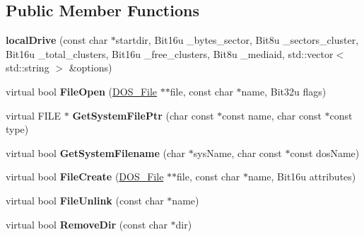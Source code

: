 \subsection*{Public Member Functions}
\begin{DoxyCompactItemize}
\item 
\hypertarget{classlocalDrive_aef6ba8f0095a362694e5b505836dd3a3}{{\bfseries local\-Drive} (const char $\ast$startdir, Bit16u \-\_\-bytes\-\_\-sector, Bit8u \-\_\-sectors\-\_\-cluster, Bit16u \-\_\-total\-\_\-clusters, Bit16u \-\_\-free\-\_\-clusters, Bit8u \-\_\-mediaid, std\-::vector$<$ std\-::string $>$ \&options)}\label{classlocalDrive_aef6ba8f0095a362694e5b505836dd3a3}

\item 
\hypertarget{classlocalDrive_ad995ca152b5317564349a83c1b71147c}{virtual bool {\bfseries File\-Open} (\hyperlink{classDOS__File}{D\-O\-S\-\_\-\-File} $\ast$$\ast$file, const char $\ast$name, Bit32u flags)}\label{classlocalDrive_ad995ca152b5317564349a83c1b71147c}

\item 
\hypertarget{classlocalDrive_acc272d364d252ecb9823d4391487aa9a}{virtual F\-I\-L\-E $\ast$ {\bfseries Get\-System\-File\-Ptr} (char const $\ast$const name, char const $\ast$const type)}\label{classlocalDrive_acc272d364d252ecb9823d4391487aa9a}

\item 
\hypertarget{classlocalDrive_adde1e1e3bfcb6fc872b95811afcbd912}{virtual bool {\bfseries Get\-System\-Filename} (char $\ast$sys\-Name, char const $\ast$const dos\-Name)}\label{classlocalDrive_adde1e1e3bfcb6fc872b95811afcbd912}

\item 
\hypertarget{classlocalDrive_aebbef4c6ec78533bb0a5d9fd3d516926}{virtual bool {\bfseries File\-Create} (\hyperlink{classDOS__File}{D\-O\-S\-\_\-\-File} $\ast$$\ast$file, const char $\ast$name, Bit16u attributes)}\label{classlocalDrive_aebbef4c6ec78533bb0a5d9fd3d516926}

\item 
\hypertarget{classlocalDrive_a52db5697876d2dead4bb414f773c78db}{virtual bool {\bfseries File\-Unlink} (const char $\ast$name)}\label{classlocalDrive_a52db5697876d2dead4bb414f773c78db}

\item 
\hypertarget{classlocalDrive_a5cd7f73b33837c8578c0446b9f3af3ba}{virtual bool {\bfseries Remove\-Dir} (const char $\ast$dir)}\label{classlocalDrive_a5cd7f73b33837c8578c0446b9f3af3ba}


\end{DoxyCompactItemize}
